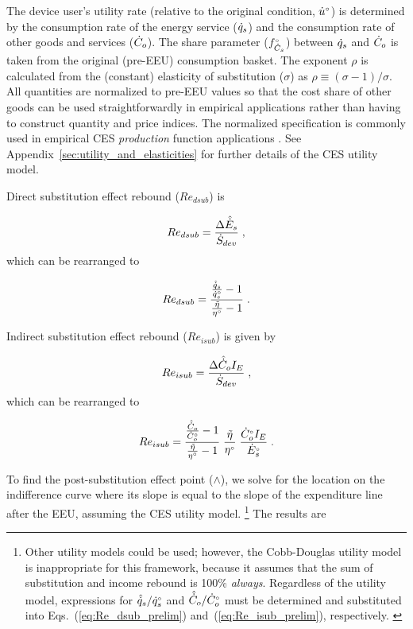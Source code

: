 \documentclass[12pt]{article}\usepackage[]{graphicx}\usepackage[]{xcolor}
\begin{document}
The device user's utility rate
(relative to the original condition, ${}{\dot{u}}^{\scriptscriptstyle \circ}$)
is determined by
the consumption rate of the energy service ($\dot{q}_s$) and
the consumption rate of other goods and services ($\dot{C}_o$).
The share parameter (${}{f}^{\scriptscriptstyle \circ}_{\dot{C}_s}$) 
between $\dot{q}_s$ and $\dot{C}_o$
is taken from the original (pre-EEU) consumption basket.
The exponent $\rho$ is calculated from the (constant) 
elasticity of substitution ($\sigma$) 
as $\rho \equiv (\sigma - 1)/\sigma$.
All quantities are normalized to pre-EEU values so that
the cost share of other goods can be used straightforwardly 
in empirical applications rather than having
to construct quantity and price indices.
The normalized specification is commonly used in empirical CES \emph{production}
function applications \citep{Klump2012,Temple2012,Gechert2021}.
See Appendix~\ref{sec:utility_and_elasticities}
for further details of the CES utility model.

Direct substitution effect rebound ($Re_{dsub}$) is

\begin{equation} \label{eq:Re_dsub_def}
  Re_{dsub} = \frac{\Delta \hat{\dot{E}}_s}{\dot{S}_{dev}} \; ,
\end{equation}
%
which can be rearranged to

\begin{equation} \label{eq:Re_dsub_prelim}
  Re_{dsub} = \frac{\frac{\hat{\dot{q}}_s}{{}{\dot{q}}^{\scriptscriptstyle \circ}_s} - 1}{\frac{\tilde{\eta}}{{}{\eta}^{\scriptscriptstyle \circ}} - 1} \; .
\end{equation}

Indirect substitution effect rebound ($Re_{isub}$) is given by

\begin{equation} \label{eq:Re_isub_def}
  Re_{isub} = \frac{\Delta \hat{\dot{C}}_o I_E}{\dot{S}_{dev}} \; ,
\end{equation}
%
which can be rearranged to 

\begin{equation} \label{eq:Re_isub_prelim}
  Re_{isub} = \frac{\frac{\hat{\dot{C}}_o}{{}{\dot{C}}^{\scriptscriptstyle \circ}_o} - 1}{\frac{\tilde{\eta}}{{}{\eta}^{\scriptscriptstyle \circ}} - 1} \; 
                          \frac{\tilde{\eta}}{{}{\eta}^{\scriptscriptstyle \circ}} \; 
                          \frac{{}{\dot{C}}^{\scriptscriptstyle \circ}_o I_E}{{}{\dot{E}}^{\scriptscriptstyle \circ}_s} \; .
\end{equation}

To find the post-substitution effect point ($\wedge$),
we solve for the location on the indifference curve
where its slope is equal to the slope of the
expenditure line after the EEU, 
assuming the CES utility model.%
\footnote{
  Other utility models could be used; however, 
  the Cobb-Douglas utility model is inappropriate for this framework, 
  because it assumes that the sum 
  of substitution and income rebound is 100\% \emph{always}.
  Regardless of the utility model, expressions for
  $\hat{\dot{q}}_s/{}{\dot{q}}^{\scriptscriptstyle \circ}_s$ and
  $\hat{\dot{C}}_o/{}{\dot{C}}^{\scriptscriptstyle \circ}_o$
  must be determined
  and substituted into 
  Eqs.~(\ref{eq:Re_dsub_prelim}) and~(\ref{eq:Re_isub_prelim}), 
  respectively.
  \label{fn:other_utility_models}
}
%
The results are
\end{document}
